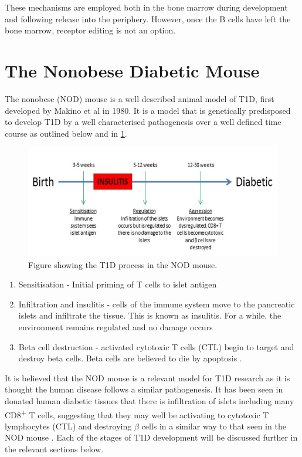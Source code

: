 These mechanisms are employed both in the bone marrow during development and following release into the periphery.
However, once the B cells have left the bone marrow, receptor editing is not an option.



\section{The Nonobese Diabetic Mouse}

The nonobese (NOD) mouse is a well described animal model of T1D, first developed by Makino et al  in 1980.
It is a model that is genetically predisposed to develop T1D by a well characterised pathogenesis over a well defined time course as outlined below and in \cref{fig:diseasecourse}.

\begin{figure}
\includegraphics[width=\textwidth]{Figures/Diseasecourse.png}
\caption{Figure showing the T1D process in the NOD mouse.}
\label{fig:diseasecourse}
\end{figure}

\begin{enumerate}
\item Sensitisation - Initial priming of T cells to islet antigen
\item Infiltration and insulitis - cells of the immune system move to the pancreatic islets and infiltrate the tissue. This is known as insulitis. For a while, the environment remains regulated and no damage occurs
\item Beta cell destruction - activated cytotoxic T cells (CTL) begin to target and destroy beta cells. Beta cells are believed to die by apoptosis \citep{Cnop2005}.
\end{enumerate}

It is believed that the NOD mouse is a relevant model for T1D research as it is thought the human disease follows a similar pathogenesis.
It has been seen in donated human diabetic tissues that there is infiltration of islets including many CD8\textsuperscript{+} T cells, suggesting that they may well be activating to cytotoxic T lymphocytes (CTL) and destroying $\beta$ cells in a similar way to that seen in the NOD mouse \citep{Hanafusa2008}.
Each of the stages of T1D development will be discussed further in the relevant sections below.


